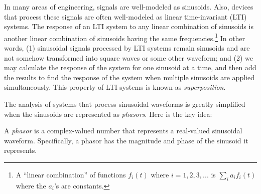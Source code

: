 

\label{m0033_Phasors} %

In many areas of engineering, signals are well-modeled as sinusoids.
Also, devices that process these signals are often well-modeled as linear time-invariant (LTI) systems.
The response of an LTI system to any linear combination of sinusoids is another linear combination of sinusoids having the same frequencies.\footnote{ A ``linear combination'' of functions $f_i(t)$ where $i=1,2,3,...$ is $\sum_i {a_i f_i(t)}$ where the $a_i$'s are constants.}
In other words, 
(1) sinusoidal signals processed by LTI systems remain sinusoids and are not somehow transformed into square waves or some other waveform; and 
(2) we may calculate the response of the system for one sinusoid at a time, and then add the results to find the response of the system when multiple sinusoids are applied simultaneously.
This property of LTI systems is known as \emph{superposition}.

The analysis of systems that process sinusoidal waveforms is greatly simplified when the sinusoids are represented as \emph{phasors}.
Here is the key idea:
%
\begin{mdframed}[backgroundcolor=yellow!20,nobreak=true] 
A \emph{phasor} 
is a complex-valued number that represents a real-valued sinusoidal waveform.  Specifically, a phasor has the magnitude and phase of the sinusoid it represents.
\end{mdframed}


